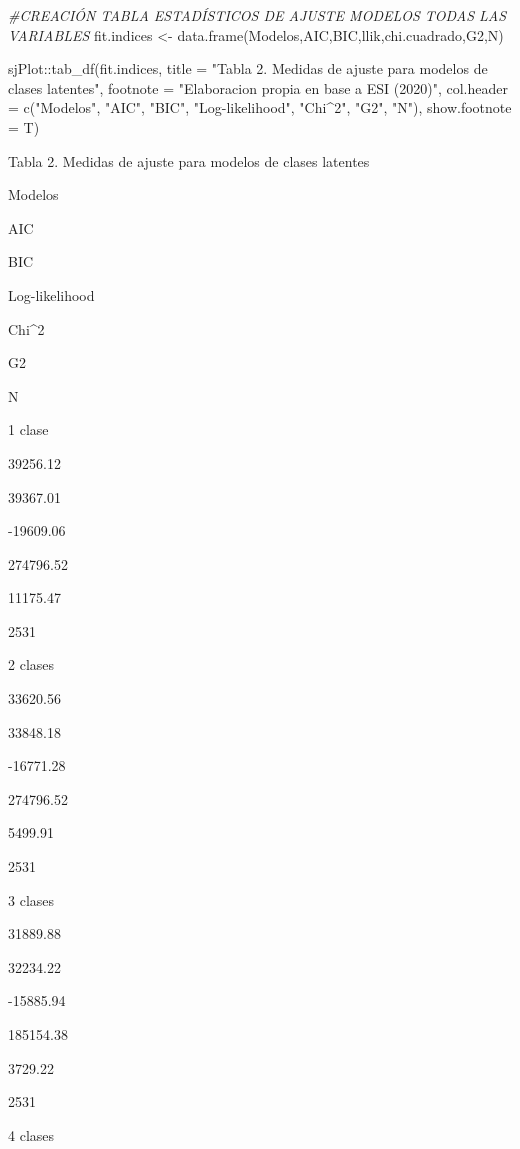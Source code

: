 \documentclass[
]{article}
\newenvironment{Shaded}{\begin{snugshade}}{\end{snugshade}}
\newcommand{\AttributeTok}[1]{\textcolor[rgb]{0.77,0.63,0.00}{#1}}
\newcommand{\CommentTok}[1]{\textcolor[rgb]{0.56,0.35,0.01}{\textit{#1}}}
\newcommand{\FunctionTok}[1]{\textcolor[rgb]{0.00,0.00,0.00}{#1}}
\newcommand{\NormalTok}[1]{#1}
\newcommand{\OtherTok}[1]{\textcolor[rgb]{0.56,0.35,0.01}{#1}}
\newcommand{\SpecialCharTok}[1]{\textcolor[rgb]{0.00,0.00,0.00}{#1}}
\newcommand{\StringTok}[1]{\textcolor[rgb]{0.31,0.60,0.02}{#1}}
\begin{document}
\begin{Shaded}
\begin{Highlighting}[]
\CommentTok{\#CREACIÓN TABLA ESTADÍSTICOS DE AJUSTE MODELOS TODAS LAS VARIABLES}
\NormalTok{fit.indices }\OtherTok{\textless{}{-}} \FunctionTok{data.frame}\NormalTok{(Modelos,AIC,BIC,llik,chi.cuadrado,G2,N)}

\NormalTok{sjPlot}\SpecialCharTok{::}\FunctionTok{tab\_df}\NormalTok{(fit.indices,}
               \AttributeTok{title =} \StringTok{"Tabla 2.}
\StringTok{               Medidas de ajuste para modelos de clases latentes"}\NormalTok{,}
               \AttributeTok{footnote =} \StringTok{"Elaboracion propia en base a ESI (2020)"}\NormalTok{,}
               \AttributeTok{col.header =} \FunctionTok{c}\NormalTok{(}\StringTok{"Modelos"}\NormalTok{, }\StringTok{"AIC"}\NormalTok{, }\StringTok{"BIC"}\NormalTok{, }\StringTok{"Log{-}likelihood"}\NormalTok{, }\StringTok{"Chi\^{}2"}\NormalTok{, }\StringTok{"G2"}\NormalTok{, }\StringTok{"N"}\NormalTok{),}
               \AttributeTok{show.footnote =}\NormalTok{ T)}
\end{Highlighting}
\end{Shaded}

Tabla 2. Medidas de ajuste para modelos de clases latentes

Modelos

AIC

BIC

Log-likelihood

Chi\^{}2

G2

N

1 clase

39256.12

39367.01

-19609.06

274796.52

11175.47

2531

2 clases

33620.56

33848.18

-16771.28

274796.52

5499.91

2531

3 clases

31889.88

32234.22

-15885.94

185154.38

3729.22

2531

4 clases
\end{document}
